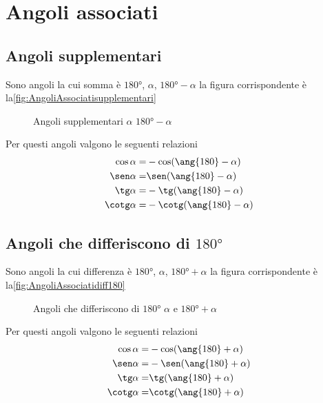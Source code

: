 \section{Angoli associati}
\label{sec:goniometriaAngoliAssociati}
\subsection{Angoli supplementari}
Sono angoli la cui somma è $\ang{180}$, $\alpha$, $\ang{180}-\alpha$ la figura corrispondente è la\nobs\vref{fig:AngoliAssociatisupplementari}
\begin{figure}
	\centering

	\caption{Angoli supplementari $\alpha$ $\ang{180}-\alpha$}
	\label{fig:AngoliAssociatisupplementari}
\end{figure}
Per questi angoli valgono le seguenti relazioni
\begin{align*}
\cos\alpha=&{}-\cos(\ang{180}-\alpha)\\
\sen\alpha=&{}\sen(\ang{180}-\alpha)\\
\tg\alpha=&{}-\tg(\ang{180}-\alpha)\\
\cotg\alpha=&{}-\cotg(\ang{180}-\alpha)
\end{align*}
\subsection{Angoli che differiscono di $\ang{180}$}
Sono angoli la cui differenza è $\ang{180}$, $\alpha$, $\ang{180}+\alpha$ la figura corrispondente è la\nobs\vref{fig:AngoliAssociatidiff180}
\begin{figure}
	\centering
	
	\caption{Angoli che differiscono di $\ang{180}$ $\alpha$ e $\ang{180}+\alpha$}
			\label{fig:AngoliAssociatidiff180}
\end{figure}
Per questi angoli valgono le seguenti relazioni
\begin{align*}
\cos\alpha=&{}-\cos(\ang{180}+\alpha)\\
\sen\alpha=&{}-\sen(\ang{180}+\alpha)\\
\tg\alpha=&{}\tg(\ang{180}+\alpha)\\
\cotg\alpha=&{}\cotg(\ang{180}+\alpha)
\end{align*}
